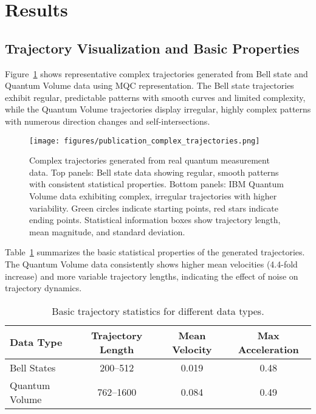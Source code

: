 \section{Results}
\label{sec:results}

\subsection{Trajectory Visualization and Basic Properties}

Figure~\ref{fig:trajectories} shows representative complex trajectories generated from Bell state and Quantum Volume data using MQC representation. The Bell state trajectories exhibit regular, predictable patterns with smooth curves and limited complexity, while the Quantum Volume trajectories display irregular, highly complex patterns with numerous direction changes and self-intersections.

\begin{figure}[htb]
\centering
\texttt{[image: figures/publication\_complex\_trajectories.png]}
\caption{Complex trajectories generated from real quantum measurement data. Top panels: Bell state data showing regular, smooth patterns with consistent statistical properties. Bottom panels: IBM Quantum Volume data exhibiting complex, irregular trajectories with higher variability. Green circles indicate starting points, red stars indicate ending points. Statistical information boxes show trajectory length, mean magnitude, and standard deviation.}
\label{fig:trajectories}
\end{figure}

Table~\ref{tab:basic_stats} summarizes the basic statistical properties of the generated trajectories. The Quantum Volume data consistently shows higher mean velocities (4.4-fold increase) and more variable trajectory lengths, indicating the effect of noise on trajectory dynamics.

\begin{table}[htb]
\centering
\caption{Basic trajectory statistics for different data types.}
\label{tab:basic_stats}
\begin{tabular}{lccc}
\hline\hline
Data Type & Trajectory Length & Mean Velocity & Max Acceleration \\
\hline
Bell States & 200--512 & 0.019 & 0.48 \\
Quantum Volume & 762--1600 & 0.084 & 0.49 \\
\hline\hline
\end{tabular}
\end{table}

